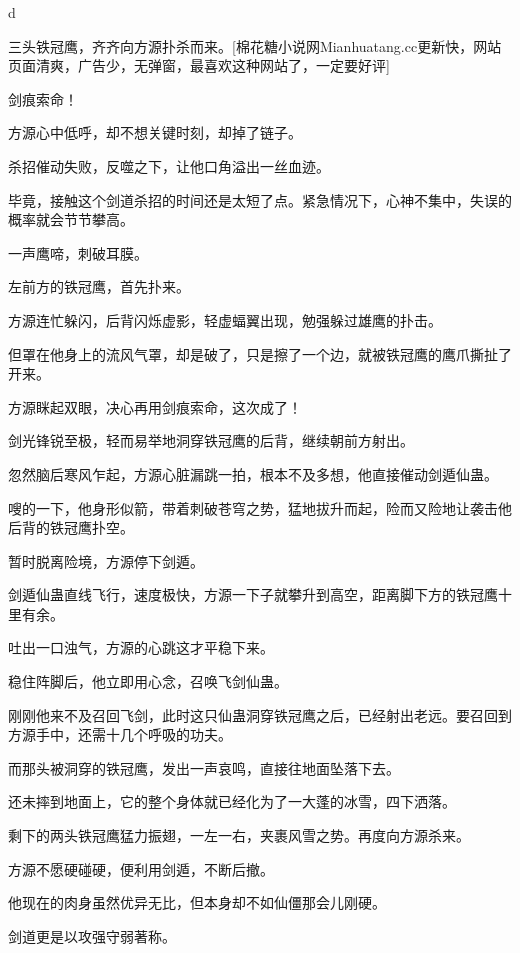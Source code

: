 
\begin{this_body}

d

三头铁冠鹰，齐齐向方源扑杀而来。[棉花糖小说网Mianhuatang.cc更新快，网站页面清爽，广告少，无弹窗，最喜欢这种网站了，一定要好评]

剑痕索命！

方源心中低呼，却不想关键时刻，却掉了链子。

杀招催动失败，反噬之下，让他口角溢出一丝血迹。

毕竟，接触这个剑道杀招的时间还是太短了点。紧急情况下，心神不集中，失误的概率就会节节攀高。

一声鹰啼，刺破耳膜。

左前方的铁冠鹰，首先扑来。

方源连忙躲闪，后背闪烁虚影，轻虚蝠翼出现，勉强躲过雄鹰的扑击。

但罩在他身上的流风气罩，却是破了，只是擦了一个边，就被铁冠鹰的鹰爪撕扯了开来。

方源眯起双眼，决心再用剑痕索命，这次成了！

剑光锋锐至极，轻而易举地洞穿铁冠鹰的后背，继续朝前方射出。

忽然脑后寒风乍起，方源心脏漏跳一拍，根本不及多想，他直接催动剑遁仙蛊。

嗖的一下，他身形似箭，带着刺破苍穹之势，猛地拔升而起，险而又险地让袭击他后背的铁冠鹰扑空。

暂时脱离险境，方源停下剑遁。

剑遁仙蛊直线飞行，速度极快，方源一下子就攀升到高空，距离脚下方的铁冠鹰十里有余。

吐出一口浊气，方源的心跳这才平稳下来。

稳住阵脚后，他立即用心念，召唤飞剑仙蛊。

刚刚他来不及召回飞剑，此时这只仙蛊洞穿铁冠鹰之后，已经射出老远。要召回到方源手中，还需十几个呼吸的功夫。

而那头被洞穿的铁冠鹰，发出一声哀鸣，直接往地面坠落下去。

还未摔到地面上，它的整个身体就已经化为了一大蓬的冰雪，四下洒落。

剩下的两头铁冠鹰猛力振翅，一左一右，夹裹风雪之势。再度向方源杀来。

方源不愿硬碰硬，便利用剑遁，不断后撤。

他现在的肉身虽然优异无比，但本身却不如仙僵那会儿刚硬。

剑道更是以攻强守弱著称。


\end{this_body}
